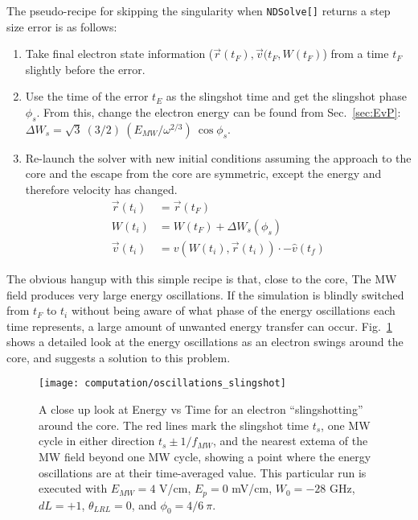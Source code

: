 \documentclass[aps,pra,preprint,groupedaddress]{revtex4-1}
\begin{document}
The pseudo-recipe for skipping the singularity when \texttt{NDSolve[]} returns a step size error is as follows:
\begin{enumerate}
	\item Take final electron state information ($\vec{r}(t_{F}), \vec{v}(t_{F}, W(t_{F})$) from a time $t_F$ slightly before the error.
	\item Use the time of the error $t_E$ as the slingshot time and get the slingshot phase $\phi_s$. From this, change the electron energy can be found from Sec.~\ref{sec:EvP}:  $\Delta W_{s} = \sqrt{3} ~ (3/2) ~ (E_{MW}/\omega^{2/3}) ~ \cos{\phi_s}$.
	\item Re-launch the solver with new initial conditions assuming the approach to the core and the escape from the core are symmetric, except the energy and therefore velocity has changed. \begin{align*}
	\vec{r}(t_i) & = \vec{r}(t_F) \\
	W(t_i) & = W(t_F) + \Delta W_s(\phi_s) \\
	\vec{v}(t_i) & = v(W(t_i), \vec{r}(t_i)) \cdot -\hat{v}(t_f)
	\end{align*}
\end{enumerate}

The obvious hangup with this simple recipe is that, close to the core, The MW field produces very large energy oscillations. If the simulation is blindly switched from $t_F$ to $t_i$ without being aware of what phase of the energy oscillations each time represents, a large amount of unwanted energy transfer can occur. Fig.~\ref{fig:oscsling} shows a detailed look at the energy oscillations as an electron swings around the core, and suggests a solution to this problem.

\begin{figure}
\texttt{[image: computation/oscillations\_slingshot]}
\caption{\label{fig:oscsling} A close up look at Energy vs Time for an electron ``slingshotting'' around the core. The red lines mark the slingshot time $t_s$, one MW cycle in either direction $t_s \pm 1/f_{MW}$, and the nearest extema of the MW field beyond one MW cycle, showing a point where the energy oscillations are at their time-averaged value. This particular run is executed with $E_{MW} = 4$ V/cm, $E_p = 0$ mV/cm, $W_0 = -28$ GHz, $dL = +1$, $\theta_{LRL} = 0$, and $\phi_0 = 4/6 ~ \pi$.}
\end{figure}
\end{document}

